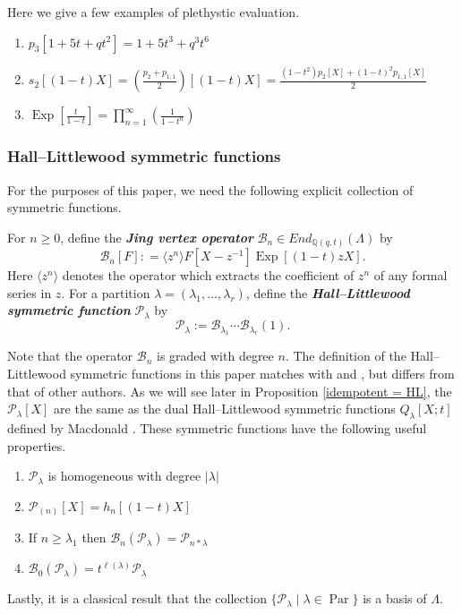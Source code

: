 \documentclass[ALCO,Unicode]{cedram}
\DeclareMathOperator{\EXP}{\mathrm{Exp}}
\DeclareMathOperator{\Par}{\mathrm{Par}}
\begin{document}
\begin{exam}
Here we give a few examples of plethystic evaluation.
    \begin{enumerate}
        \item $p_3[1+5t+qt^2] = 1+5t^3 + q^3t^6$
        \item $s_{2}[(1-t)X] = (\frac{p_2+p_{1,1}}{2})[(1-t)X] = \frac{(1-t^2)p_2[X]+(1-t)^2p_{1,1}[X]}{2}$
        \item $\EXP[\frac{t}{1-t}]= \prod_{n=1}^{\infty}(\frac{1}{1-t^n})$
    \end{enumerate}
\end{exam}





\subsubsection{Hall--Littlewood symmetric functions}
For the purposes of this paper, we need the following explicit collection of symmetric functions.
\begin{defi}\label{Jing op defn}
    For $n \geq 0$, define the \textbf{\textit{Jing vertex operator}} $\mathscr{B}_n \in End_{\mathbb{Q}(q,t)}(\Lambda)$ by
    $$\mathscr{B}_n[F] : = \langle z^n \rangle F[X-z^{-1}]\EXP[(1-t)zX].$$
    Here $\langle z^n \rangle $ denotes the operator which extracts the coefficient of $z^n$ of any formal series in $z$. For a partition $\lambda = (\lambda_1,\ldots,\lambda_r)$, define the \textbf{\textit{Hall--Littlewood symmetric function}} $\mathcal{P}_{\lambda}$ by 
    $$\mathcal{P}_{\lambda}:= \mathscr{B}_{\lambda_1}\cdots \mathscr{B}_{\lambda_r}(1).$$
\end{defi}

Note that the operator $\mathscr{B}_n$ is graded with degree $n.$ The definition of the Hall--Littlewood symmetric functions in this paper matches with \cite{Ion_2022} and \cite{CM_2015}, but differs from that of other authors. As we will see later in Proposition \ref{idempotent = HL}, the $\mathcal{P}_{\lambda}[X]$ are the same as the dual Hall--Littlewood symmetric functions $Q_{\lambda}[X;t]$ defined by Macdonald \cite{Macdonald}. These symmetric functions have the following useful properties.
\begin{enumerate}
    \item $\mathcal{P}_{\lambda}$ is homogeneous with degree $|\lambda|$
    \item $\mathcal{P}_{(n)}[X] = h_{n}[(1-t)X]$
    \item If $n \geq \lambda_1$ then $\mathscr{B}_{n}(\mathcal{P}_{\lambda}) = \mathcal{P}_{n*\lambda}$
    \item $\mathscr{B}_{0}(\mathcal{P}_{\lambda}) = t^{\ell(\lambda)} \mathcal{P}_{\lambda}$
\end{enumerate}
Lastly, it is a classical result that the collection $\{\mathcal{P}_\lambda \mid \lambda \in \Par\}$ is a basis of $\Lambda$.
\end{document}
